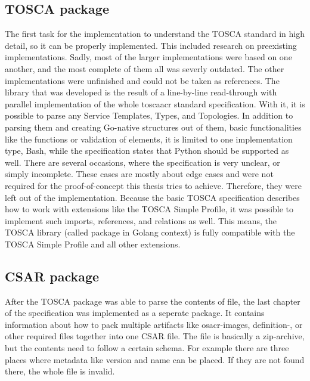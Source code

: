 \subsection{TOSCA package}
The first task for the implementation to understand the TOSCA standard in high detail, so it can be properly implemented. This included research on preexisting implementations. Sadly, most of the larger implementations were based on one another, and the most complete of them all was severly outdated. %
The other implementations were unfinished and could not be taken as references. %
\newline
The library that was developed is the result of a line-by-line read-through with parallel implementation of the whole \gls{toscaacr} standard specification.
\newline
With it, it is possible to parse any Service Templates, Types, and Topologies.
In addition to parsing them and creating Go-native structures out of them, basic functionalities like the %
functions or validation of elements, it is limited to one implementation type, Bash, while the specification states that Python should be supported as well. There are several occasions, where the specification is very unclear, or simply incomplete. These cases are mostly about edge cases and were not required for the proof-of-concept this thesis tries to achieve. Therefore, they were left out of the implementation.
\newline
Because the basic TOSCA specification describes how to work with extensions like the TOSCA Simple Profile, it was possible to implement such imports, references, and relations as well. This means, the TOSCA library (called package in Golang context) is fully compatible with the TOSCA Simple Profile and all other extensions.


\subsection{CSAR package}
After the TOSCA package was able to parse the contents of file, the last chapter of the specification was implemented as a seperate package. It contains information about how to pack multiple artifacts like \gls{osacr}-images, definition-, or other required files together into one CSAR file. The file is basically a zip-archive, but the contents need to follow a certain schema. For example there are three places where metadata like version and name can be placed. If they are not found there, the whole file is invalid.

